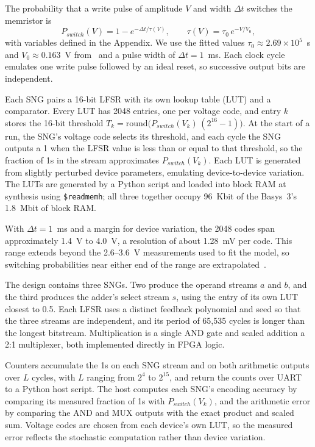 \documentclass[conference]{IEEEtran}
\begin{document}
The probability that a write pulse of amplitude $V$ and width $\Delta t$
switches the memristor is
\begin{equation}
  P_{switch}(V) = 1 - e^{-\Delta t/\tau(V)}, \qquad
  \tau(V) = \tau_0\, e^{-V/V_0},
  \label{eq:pswitch}
\end{equation}
with variables defined in the Appendix. We use the fitted values
$\tau_0 \approx 2.69\times10^{5}$~s and $V_0 \approx 0.163$~V
from~\cite{memristor_stochasticity} and a pulse width of $\Delta t = 1$~ms.
Each clock cycle emulates one write pulse followed by an ideal reset, so
successive output bits are independent.

Each SNG pairs a 16-bit LFSR with its own lookup table (LUT) and a
comparator. Every LUT has 2048 entries, one per voltage code, and entry $k$
stores the 16-bit threshold
$T_k = \mathrm{round}\big(P_{switch}(V_k)\,(2^{16}-1)\big)$. At the start of
a run, the SNG's voltage code selects its threshold, and each cycle the SNG
outputs a 1 when the LFSR value is less than or equal to that threshold, so
the fraction of 1s in the stream approximates $P_{switch}(V_k)$. Each LUT is
generated from slightly perturbed device parameters, emulating
device-to-device variation. The LUTs are generated by a Python script and loaded 
into block RAM at synthesis using \texttt{\$readmemh}; all three together occupy 
96~Kbit of the Basys~3's 1.8~Mbit of block RAM.

With $\Delta t = 1$~ms and a margin for device variation, the 2048 codes span
approximately 1.4~V to 4.0~V, a resolution of about 1.28~mV per code. This
range extends beyond the 2.6--3.6~V measurements used to fit the model, so
switching probabilities near either end of the range are
extrapolated~\cite{memristor_stochasticity}.

The design contains three SNGs. Two produce the operand streams $a$ and $b$,
and the third produces the adder's select stream $s$, using the entry of its
own LUT closest to 0.5. Each LFSR uses a distinct feedback polynomial and
seed so that the three streams are independent, and its period of 65,535 cycles is longer than the longest
bitstream. Multiplication is a single AND gate and scaled addition a 2:1
multiplexer, both implemented directly in FPGA logic.

Counters accumulate the 1s on each SNG stream and on both arithmetic outputs
over $L$ cycles, with $L$ ranging from $2^{4}$ to $2^{15}$, and return the
counts over UART to a Python host script. The host computes each SNG's
encoding accuracy by comparing its measured fraction of 1s with
$P_{switch}(V_k)$, and the arithmetic error by comparing the AND and MUX
outputs with the exact product and scaled sum. 
Voltage codes are chosen from each device's own LUT, so the measured error 
reflects the stochastic computation rather than device variation.
\end{document}
